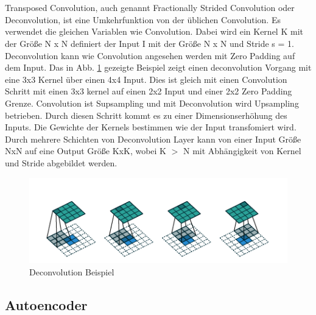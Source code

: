 \documentclass{llncs}
\begin{document}
\\\\
Transposed Convolution, auch genannt Fractionally Strided Convolution oder Deconvolution, ist eine Umkehrfunktion von der üblichen Convolution. Es verwendet die gleichen Variablen wie Convolution. Dabei wird ein Kernel K mit der Größe N x N definiert der Input I mit der Größe N x N und Stride s = 1. Deconvolution kann wie Convolution angesehen werden mit  Zero Padding auf dem Input.  Das in Abb. \ref{fig:Bild12} gezeigte Beispiel zeigt einen deconvolution Vorgang mit eine 3x3 Kernel über einen 4x4 Input. Dies ist gleich mit einen Convolution Schritt mit einen 3x3 kernel auf einen 2x2 Input und einer 2x2 Zero Padding Grenze. Convolution ist Supsampling und mit Deconvolution wird Upsampling betrieben. Durch diesen Schritt kommt es zu einer Dimensionserhöhung des Inputs. Die Gewichte der Kernels bestimmen wie der Input transfomiert wird. Durch mehrere Schichten von Deconvolution Layer kann von einer Input Größe NxN auf eine Output Größe KxK, wobei K $>$ N mit Abhängigkeit von Kernel und Stride abgebildet werden\cite{conv}. 

\begin{figure}[htbp] 
	\centering
	\includegraphics[width=1.0\textwidth]{decon.png}
	\caption{Deconvolution Beispiel \protect\cite{conv}}
	\label{fig:Bild12}
\end{figure}
\newpage
\subsection{Autoencoder}\label{sec:autoencoder}
\end{document}
